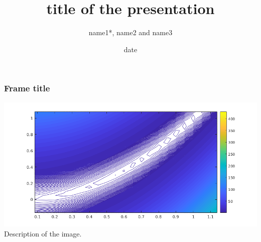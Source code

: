 \documentclass[aspectratio=169]{beamer}
\title{title of the presentation​​}
\author[name1, name2, name3]{name1*, name2 and name3}
\date[site]{date}
\begin{document}
\begin{frame}
 \titlepage 
\end{frame}

\begin{frame}
 \frametitle{Frame title}
 \includegraphics[scale=0.6]{images/rosenbrockzoom.png}
 Description of the image.
\end{frame}
\end{document}
